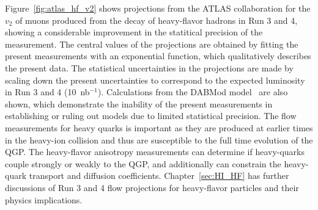 Figure~\ref{fig:atlas_hf_v2} shows projections from the ATLAS collaboration
  for the $v_2$ of muons produced from the decay of heavy-flavor hadrons
  in Run 3 and 4, showing a considerable improvement in the statitical 
  precision of the measurement.
The central values of the projections are obtained by fitting the 
  present measurements with an exponential function, which qualitatively 
  describes the present data. 
The statistical uncertainties in the projections are made by scaling down 
  the present uncertainties to correspond to the expected luminosity in 
  Run 3 and 4 (10~nb$^{−1}$).
Calculations from the DABMod model~\cite{Prado:2016szr} are also shown,
  which demonstrate the inability of the present measurements
  in establishing or ruling out models due to limited statistical precision.
The flow measurements for heavy quarks is important as they are produced at
  earlier times in the heavy-ion collision and thus are susceptible
  to the full time evolution of the QGP.
The heavy-flavor anisotropy measurements can determine if heavy-quarks couple 
  strongly or weakly to the QGP, and additionally can constrain the heavy-quark 
  transport and diffusion coefficients.
Chapter~\ref{sec:HI_HF} has further discussions of Run 3 and 4 flow projections
  for heavy-flavor particles and their physics implications. 



